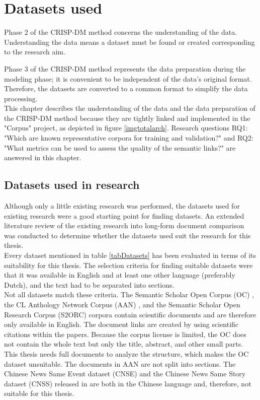 \pagebreak
\chapter{Datasets used}
\label{secRCI_II}


Phase 2 of the CRISP-DM method concerns the understanding of the data. Understanding the data means a dataset must be found or created corresponding to the research aim. 

Phase 3 of the CRISP-DM method represents the data preparation during the modeling phase; it is convenient to be independent of the data's original format. Therefore, the datasets are converted to a common format to simplify the data processing. \\


This chapter describes the understanding of the data and the data preparation of the CRISP-DM method because they are tightly linked and implemented in the "Corpus" project, as depicted in figure \ref{imgtotalarch}. Research questions RQ1: "Which are known representative corpora for training and validation?" and RQ2: "What metrics can be used to assess the quality of the semantic links?" are answered in this chapter. 
\section{Datasets used in research}
\label{secDatasetsResearch}
Although only a little existing research was performed, the datasets used for existing research were a good starting point for finding datasets. An extended literature review of the existing research into long-form document comparison was conducted to determine whether the datasets used suit the research for this thesis.\\

Every dataset mentioned in table \ref{tabDatasets} has been evaluated in terms of its suitability for this thesis. The selection criteria for finding suitable datasets were that it was available in English and at least one other language (preferably Dutch), and the text had to be separated into sections.\\

Not all datasets match these criteria. The Semantic Scholar Open Corpus (OC) \citep{Bhagavatula2018}, the CL Anthology Network Corpus (AAN) \citep{radev}, and the Semantic Scholar Open Research Corpus (S2ORC) \citep{lo2019} corpora contain scientific documents and are therefore only available in English. The document links are created by using scientific citations within the papers. Because the corpus license is limited, the OC does not contain the whole text but only the title, abstract, and other small parts. This thesis needs full documents to analyze the structure, which makes the OC dataset unsuitable. The documents in AAN are not split into sections. The Chinese News Same Event dataset (CNSE) and the Chinese News Same Story dataset (CNSS) released in \citet{Liu2019} are both in the Chinese language and, therefore, not suitable for this thesis.\\

